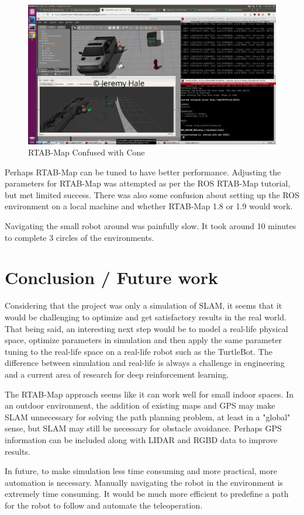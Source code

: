 \documentclass[10pt,journal,compsoc]{IEEEtran}
\begin{document}
\begin{figure}
    \centering
    \includegraphics[width=\linewidth]{confused_cone}
    \caption{RTAB-Map Confused with Cone}
    \label{fig:confused_cone}
\end{figure}

Perhaps RTAB-Map can be tuned to have better performance. Adjusting the parameters for RTAB-Map was attempted as per the ROS RTAB-Map tutorial, but met limited success. There was also some confusion about setting up the ROS environment on a local machine and whether RTAB-Map 1.8 or 1.9 would work.

Navigating the small robot around was painfully slow. It took around 10 minutes to complete 3 circles of the environments.

\section{Conclusion / Future work}
Considering that the project was only a simulation of SLAM, it seems that it would be challenging to optimize and get satisfactory results in the real world. That being said, an interesting next step would be to model a real-life physical space, optimize parameters in simulation and then apply the same parameter tuning to the real-life space on a real-life robot such as the TurtleBot. The difference between simulation and real-life is always a challenge in engineering and a current area of research for deep reinforcement learning.

The RTAB-Map approach seems like it can work well for small indoor spaces. In an outdoor environment, the addition of existing maps and GPS may make SLAM unnecessary for solving the path planning problem, at least in a "global" sense, but SLAM may still be necessary for obstacle avoidance. Perhaps GPS information can be included along with LIDAR and RGBD data to improve results.

In future, to make simulation less time consuming and more practical, more automation is necessary. Manually navigating the robot in the environment is extremely time consuming. It would be much more efficient to predefine a path for the robot to follow and automate the teleoperation.
\end{document}
